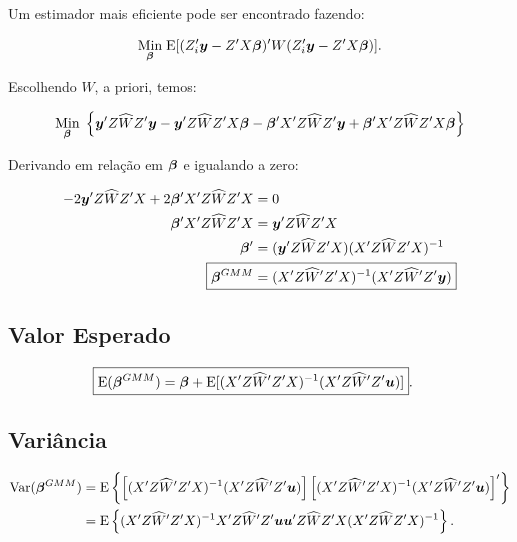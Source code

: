 \documentclass[11pt, oneside, a4paper, article]{article}
\numberwithin{equation}{section}
\begin{document}
Um estimador mais eficiente pode ser encontrado fazendo:

\vspace{-1 em}
\begin{align*}
\underset{\boldsymbol{\beta}}{\text{Min}} \;
\text{E}[ ( Z_{i}' \boldsymbol{y} - Z' X \boldsymbol{\beta} )' W ( Z_{i}' \boldsymbol{y} - Z' X \boldsymbol{\beta} ) ].
\end{align*}

\noindent
Escolhendo $\widehat{W}$, a priori, temos:

\vspace{-1 em}
\begin{align*}
\underset{\boldsymbol{\beta}}{\text{Min}} \;
\left\{ 
\boldsymbol{y}' Z \widehat{W} Z' \boldsymbol{y}
-
\boldsymbol{y}' Z \widehat{W} Z' X \boldsymbol{\beta}
-
\boldsymbol{\beta}' X'  Z \widehat{W} Z' \boldsymbol{y}
+
\boldsymbol{\beta}' X'  Z \widehat{W} Z' X \boldsymbol{\beta}
\right\}
\end{align*}

Derivando em relação em $\boldsymbol{\beta}$ e igualando a zero:

\vspace{-1 em}
\begin{align*}
-2 \mbs{y}' Z \widehat{W} Z' X + 2 \mbs{\beta}'X' Z \widehat{W} Z' X &= 0
\\
\mbs{\beta}'X' Z \widehat{W} Z' X &= \mbs{y}' Z \widehat{W} Z' X 
\\
\mbs{\beta}' &= ( \mbs{y}' Z \widehat{W} Z' X ) ( X' Z \widehat{W} Z' X )^{-1}
\\
\Aboxed{
\mbs{\beta}^{GMM} &= ( X' Z \widehat{W}' Z' X )^{-1} ( X' Z \widehat{W}' Z' \mbs{y} ) }
\end{align*}

\subsection*{Valor Esperado} 

\vspace{-1 em}
\begin{align*}
\Aboxed{
\E( \mbs{\beta}^{GMM} ) &=
\mbs{\beta} +
\E[ ( X' Z \widehat{W}' Z' X )^{-1} ( X' Z \widehat{W}' Z' \mbs{u} ) ] }.
\end{align*}

\subsection*{Variância} 

\vspace{-1 em}
\begin{align*}
\text{Var}( \boldsymbol{\beta}^{GMM} ) &=
\text{E} \left\{ 
\left[ ( X' Z \widehat{W}' Z' X )^{-1} ( X' Z \widehat{W}' Z' \boldsymbol{u} ) \right]
\left[ ( X' Z \widehat{W}' Z' X )^{-1} ( X' Z \widehat{W}' Z' \boldsymbol{u} ) \right]'
\right\}
\\ &=
\text{E} \left\{ 
( X' Z \widehat{W}' Z' X )^{-1}
X' Z \widehat{W}' Z' \boldsymbol{u} \boldsymbol{u}' Z \widehat{W} Z' X 
( X' Z \widehat{W} Z' X )^{-1}
\right\}.
\end{align*}
\end{document}
